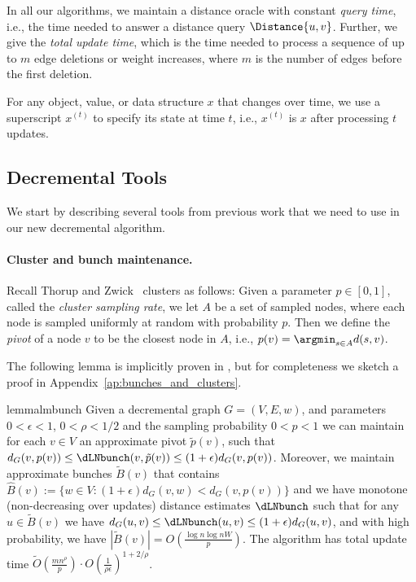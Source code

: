 In all our algorithms, we maintain a distance oracle with constant \emph{query time}, i.e., the time needed to answer a distance query $\Distance{u,v}$.
Further, we give the \emph{total update time}, which is the time needed to process a sequence of up to $m$ edge deletions or weight increases, where $m$ is the number of edges before the first deletion. 

For any object, value, or data structure $x$ that changes over time, we use a superscript $x^{(t)}$ to specify its state at time $t$, i.e., $x^{(t)}$ is $x$ after processing $t$ updates. 



\subsection{Decremental Tools}\label{sc:decr_tools}
We start by describing several tools from previous work that we need to use in our new decremental algorithm.
\paragraph{Cluster and bunch maintenance.} 
Recall Thorup and Zwick~\cite{TZ2005} clusters as follows: Given a parameter $p\in [0,1]$, called the \emph{cluster sampling rate}, we let $A$ be a set of sampled nodes, where each node is sampled uniformly at random with probability $p$. Then we define the \emph{pivot} of a node $v$ to be the closest node in $A$, i.e., $p(v)=\argmin_{s\in A} d(s,v)$. 

The following lemma is implicitly proven in \cite{LN2020}, but for completeness we sketch a proof in Appendix~\ref{ap:bunches_and_clusters}.

\begin{restatable}{lemma}{lmbunch} \label{lm:approx_bunches_on_G}
Given a decremental graph $G=(V,E,w)$, and parameters $0< \epsilon <1$, $0<\rho<1/2$ and the sampling probability $0< p <1$ we can maintain for each $v\in V$ an approximate pivot $\tilde p(v)$, such that $d_G(v,p(v)) \leq \dLNbunch(v,\tilde{p}(v)) \leq (1+\epsilon) d_G(v,p(v))$.
Moreover, we maintain approximate bunches $\tilde{B}(v)$ that contains
$\hat{B}(v):= \{ w \in V : (1+\epsilon)d_G(v,w) < d_G(v, p(v)) \}$ and we have monotone (non-decreasing over updates) distance estimates $\dLNbunch$ such that for any $u \in \tilde{B}(v)$ we have $d_G(u,v) \leq \dLNbunch(u,v) \leq (1+\epsilon) d_G(u,v)$, and with high probability, we have $|\tilde{B}(v)| = O(\frac{\log n\log nW}{p})$. The algorithm has total update time $\tilde O(\tfrac{mn^\rho}{p}) \cdot O(\frac{1}{\rho \epsilon})^{1+2/\rho}$.
\end{restatable}

